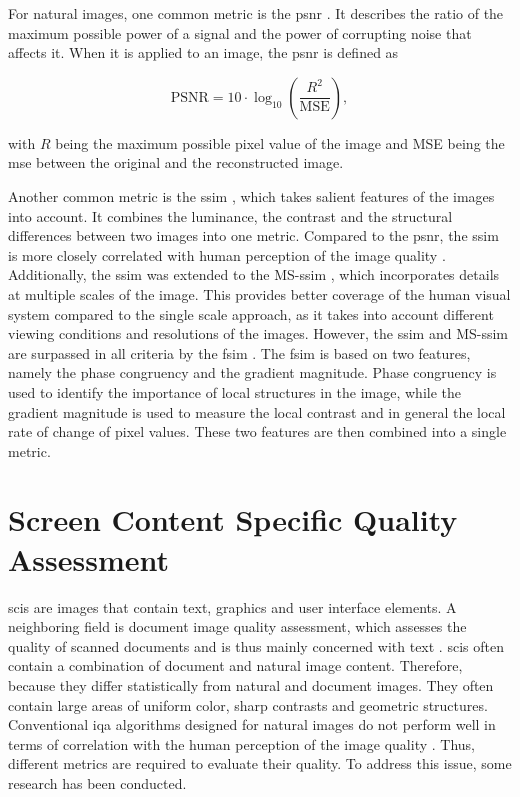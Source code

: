 For natural images, one common metric is the \gls{psnr} \cite{PSNRvsSSIM_2010}.
It describes the ratio of the maximum possible power of a signal and the power of corrupting noise that affects it.
When it is applied to an image, the \gls{psnr} is defined as

\begin{equation}
    \text{PSNR} = 10 \cdot \log_{10} \left( \frac{R^2}{\text{MSE}} \right),
    \label{eq:psnr}
\end{equation}

with \(R\) being the maximum possible pixel value of the image and MSE being the \gls{mse} between the original and the reconstructed image.

Another common metric is the \gls{ssim} \cite{SSIM_2004}, which takes salient features of the images into account.
It combines the luminance, the contrast and the structural differences between two images into one metric.
Compared to the \gls{psnr}, the \gls{ssim} is more closely correlated with human perception of the image quality \cite{frmetric_comp_2012}.
Additionally, the \gls{ssim} was extended to the MS-\gls{ssim} \cite{ms_ssim_2003}, which incorporates details at multiple scales of the image.
This provides better coverage of the human visual system compared to the single scale approach, as it takes into account different viewing conditions and resolutions of the images.
However, the \gls{ssim} and MS-\gls{ssim} are surpassed in all criteria by the \gls{fsim} \cite{fsim_2011}.
The \gls{fsim} is based on two features, namely the phase congruency and the gradient magnitude.
Phase congruency is used to identify the importance of local structures in the image, while the gradient magnitude is used to measure the local contrast and in general the local rate of change of pixel values.
These two features are then combined into a single metric.



\section{Screen Content Specific Quality Assessment}

\Glspl{sci} are images that contain text, graphics and user interface elements.
A neighboring field is document image quality assessment, which assesses the quality of scanned documents and is thus mainly concerned with text \cite{3_subj_weight_2015}.
\Glspl{sci} often contain a combination of document and natural image content.
Therefore, because they differ statistically from natural and document images.
They often contain large areas of uniform color, sharp contrasts and geometric structures.
Conventional \gls{iqa} algorithms designed for natural images do not perform well in terms of correlation with the human perception of the image quality \cite{ni_scid_2017}.
Thus, different metrics are required to evaluate their quality.
To address this issue, some research has been conducted.


